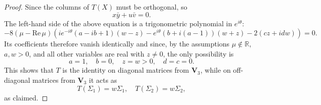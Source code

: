\documentclass[10pt,a4paper]{amsart}
\def\IR{{\mathbb R}}
\def\bV{{\mathbf V}}
\begin{document}
\begin{proof}
Since  the columns of $T(X)$  must be orthogonal, so
\begin{equation}\label{orth-cols1anew}
	x \bar{y} + u \bar{v} = 0.
\end{equation}
The left-hand side of the above equation is a trigonometric polynomial in $e^{i\theta}$:
 $$-8(\mu-\mathrm{Re}\,\mu  )  \left(i e^{-i \theta } (a-i b+1) (w-z)-e^{i \theta } (b+i (a-1)) (w+z)-2 (c z+i d w)\right)=0.$$
Its coefficients therefore vanish identically and since, by the assumptions $\mu\notin\IR$, $a,w>0$, and all other variables are real with $z \ne 0$, the only possibility is
$$a=1,\quad b=0,\quad z=w>0,\quad d=c=0.$$
This shows that $T$ is the identity on diagonal matrices from $\bV_3$, while on off-diagonal matrices from $\bV_3$ it acts as
$$T(\Sigma_1)=w \Sigma_1,\quad T(\Sigma_2)=w\Sigma_2,$$
as claimed.
\end{proof}
\end{document}
